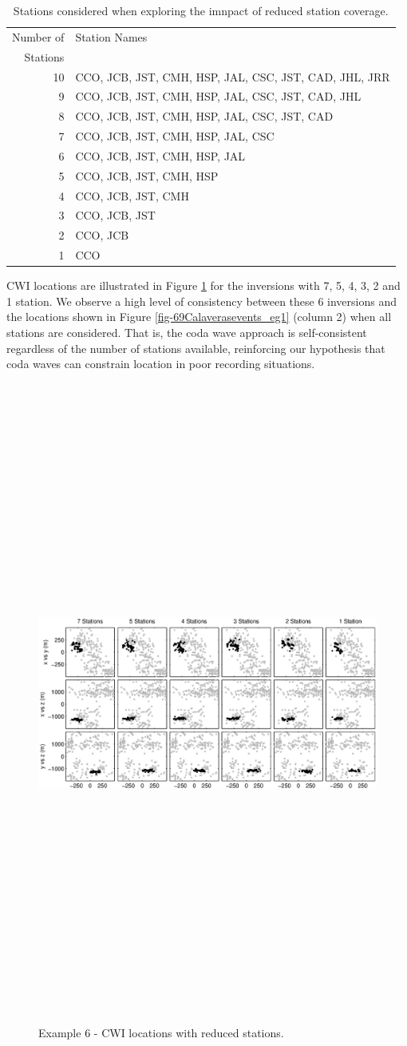 \documentclass[extra]{gji}
\begin{document}
\begin{table}
\caption{Stations considered when exploring the imnpact of reduced
station coverage.} \label{tab:Calaveras-stationremoval}
\begin{tabular}{|r|l|}
\hline
Number of & Station Names\\
Stations  & \\
\hline
10 & CCO, JCB, JST, CMH, HSP, JAL, CSC, JST, CAD, JHL, JRR\\
9  & CCO, JCB, JST, CMH, HSP, JAL, CSC, JST, CAD, JHL\\
8  & CCO, JCB, JST, CMH, HSP, JAL, CSC, JST, CAD\\
7  & CCO, JCB, JST, CMH, HSP, JAL, CSC \\
6  & CCO, JCB, JST, CMH, HSP, JAL \\
5  & CCO, JCB, JST, CMH, HSP \\
4  & CCO, JCB, JST, CMH \\
3  & CCO, JCB, JST \\
2  & CCO, JCB \\
1  & CCO \\
\hline
\end{tabular}
\end{table}


CWI locations are illustrated in Figure
\ref{fig-CWIreducesstats} for the inversions with 7, 5, 4, 3, 2 and
1 station. We observe a high level of consistency between these 6
inversions and the locations shown in Figure
\ref{fig-69Calaverasevents_eg1} (column 2) when all stations are
considered. That is, the coda wave approach is self-consistent
regardless of the number of stations available, reinforcing our
hypothesis that coda waves can constrain location in poor recording
situations.

\begin{figure}
\includegraphics[angle=90,height = 50pc]{diags/CalaverasLoc2.eps}
\caption{Example 6 - CWI locations with reduced stations.}
\label{fig-CWIreducesstats}
\end{figure}
\end{document}
